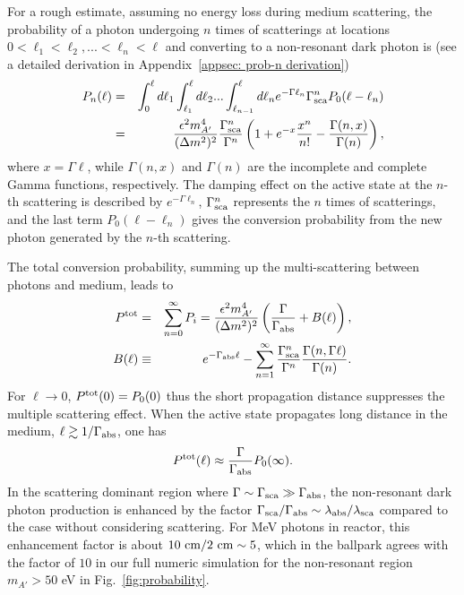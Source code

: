 \documentclass[prd,showpacs,preprintnumbers,amsmath,amssymb,twocolumn,superscriptaddress,notitlepage]{revtex4-2}
\begin{document}
For a rough estimate,  
assuming no energy loss during medium scattering,
the probability 
of a photon undergoing $n$ times of scatterings
at locations $0 < \ell_1 < \ell_2, ... < \ell_n < \ell$
and converting to a non-resonant dark photon is 
(see a detailed derivation in Appendix~\ref{appsec: prob-n derivation})
\begin{eqnarray}
P_n (\ell) &=& \int_{0}^\ell d \ell_1 
\int_{\ell_1}^\ell d \ell_2 ... 
\int_{\ell_{n-1}}^\ell d \ell_n
e^{-\Gamma \ell_n} \Gamma_{\rm sca}^n P_0(\ell -\ell_n) \nonumber \\
&=& \frac{\epsilon^2 m_{A'}^4}{(\Delta m^2)^2} \frac{\Gamma_{\rm sca}^n}{\Gamma^n}
\left(1 +e^{-x} \frac{x^n}{n!} - \frac{\Gamma(n,x)}{\Gamma(n)} \right),
\label{eq: prob-n-sca}
\end{eqnarray}
where $x=\Gamma \ell$,
while $\Gamma(n,x)$ and $\Gamma(n)$ are the incomplete and complete Gamma functions, respectively.
The damping effect on the active state at the $n$-th scattering is described by $e^{-\Gamma \ell_n}$,
$\Gamma_{\rm sca}^n$ represents the $n$ times of scatterings,
and the last term $P_0(\ell -\ell_n)$ gives the conversion probability
from the new photon generated by the $n$-th scattering. 

The total conversion probability,
summing up the multi-scattering between photons and medium, leads to
\begin{eqnarray}
P^{\rm tot} &=& \sum_{n=0}^{\infty} P_i 
= \frac{\epsilon^2 m_{A'}^4}{(\Delta m^2)^2} 
\left(\frac{\Gamma}{\Gamma_{\rm abs}} 
+ B(\ell)\right),  \\
B(\ell) &\equiv&  e^{-\Gamma_{\rm abs} \ell} - \sum_{n=1}^{\infty} \frac{\Gamma_{\rm sca}^n}{\Gamma^n}\frac{\Gamma(n,\Gamma \ell)}{\Gamma(n)}. \nonumber
\end{eqnarray}
For $\ell \to 0$, $P^{\rm tot} (0) =  P_0 (0)$ thus the short propagation distance suppresses the multiple scattering effect.
When the active state propagates long distance in the medium, $\ell \gtrsim  1/\Gamma_{\rm abs}$,
one has 
\begin{equation}
P^{\rm tot} (\ell) \approx \frac{\Gamma}{\Gamma_{\rm abs}}  P_0 (\infty).
\end{equation}
In the scattering dominant region
where $\Gamma \sim \Gamma_{\rm sca} \gg \Gamma_{\rm abs}$,
the non-resonant dark photon production
is enhanced by the factor
$\Gamma_{\rm sca} / \Gamma_{\rm abs} \sim \lambda_{\rm abs} / \lambda_{\rm sca}$
compared to the case without considering scattering.
For MeV photons in reactor, this enhancement factor is about $10~\rm{cm} / 2~\rm{cm} \sim 5$, which in the ballpark agrees with 
the factor of $10$ in our full numeric simulation for the non-resonant region $m_{A'} > 50$ eV in Fig.~\ref{fig:probability}. 
\end{document}

